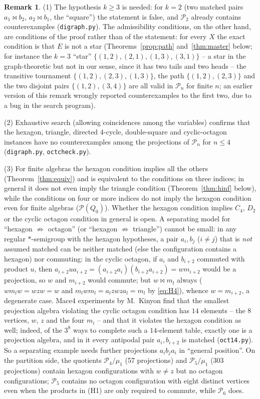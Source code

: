 \documentclass[11pt]{amsart}
\theoremstyle{definition}
\newtheorem{remark}[theorem]{Remark}
\renewcommand{\P}{\mathcal{P}}
\begin{document}
\begin{remark}\label{rem:2k}
(1) The hypothesis $k\ge3$ is needed: for $k=2$ (two matched pairs $a_1\bowtie b_2$, $a_2\bowtie b_1$, the ``square'') the statement is false, and $\P_2$ already contains counterexamples (\texttt{digraph.py}). The admissibility conditions, on the other hand, are conditions of the proof rather than of the statement: for every $X$ the exact condition is that $E$ is not a star (Theorems~\ref{prop:path} and~\ref{thm:master} below; for instance the $k=3$ ``star'' $\{(1,2),(2,1),(1,3),(3,1)\}$ -- a star in the graph-theoretic but not in our sense, since it has two tails and two heads -- the transitive tournament $\{(1,2),(2,3),(1,3)\}$, the path $\{(1,2),(2,3)\}$ and the two disjoint pairs $\{(1,2),(3,4)\}$ are all valid in $\P_n$ for finite $n$; an earlier version of this remark wrongly reported counterexamples to the first two, due to a bug in the search program).

(2) Exhaustive search (allowing coincidences among the variables) confirms that the hexagon, triangle, directed $4$-cycle, double-square and cyclic-octagon instances have no counterexamples among the projections of $\P_n$ for $n\le4$ (\texttt{digraph.py}, \texttt{octcheck.py}).

(3) For finite algebras the hexagon condition implies all the others (Theorem~\ref{thm:equiv}) and is equivalent to the conditions on three indices; in general it does not even imply the triangle condition (Theorem~\ref{thm:hinf} below), while the conditions on four or more indices do not imply the hexagon condition even for finite algebras ($\P(Q_0)$). Whether the hexagon condition implies $C_4$, $D_2$ or the cyclic octagon condition in general is open. A separating model for ``hexagon $\not\Rightarrow$ octagon'' (or ``hexagon $\not\Rightarrow$ triangle'') cannot be small: in any regular $*$-semigroup with the hexagon hypotheses, a pair $a_i,b_j$ ($i\ne j$) that is \emph{not} assumed matched can be neither matched (else the configuration contains a hexagon) nor commuting: in the cyclic octagon, if $a_i$ and $b_{i+2}$ commuted with product $u$, then $a_{i+2}ua_{i+2}=(a_{i+2}a_i)(b_{i+2}a_{i+2})=wm_{i+2}$ would be a projection, so $w$ and $m_{i+2}$ would commute; but $w\bowtie m_l$ always ($wm_lw=wzw=w$ and $m_lwm_l=a_lzwza_l=m_l$ by \eqref{eq:H4}), whence $w=m_{i+2}$, a degenerate case. Mace4 experiments by M.~Kinyon find that the smallest projection algebra violating the cyclic octagon condition has $14$ elements -- the $8$ vertices, $w$, $z$ and the four $m_i$ -- and that it violates the hexagon condition as well; indeed, of the $3^8$ ways to complete such a $14$-element table, exactly one is a projection algebra, and in it every antipodal pair $a_i,b_{i+2}$ is matched (\texttt{oct14.py}). So a separating example needs further projections $a_ib_ja_i$ in ``general position''. On the partition side, the quotients $\P_4/\mu_1$ (57 projections) and $\P_5/\mu_1$ (303 projections) contain hexagon configurations with $w\ne z$ but no octagon configurations; $\P_5$ contains no octagon configuration with eight distinct vertices even when the products in (H1) are only required to commute, while $\P_6$ does.
\end{remark}
\end{document}
